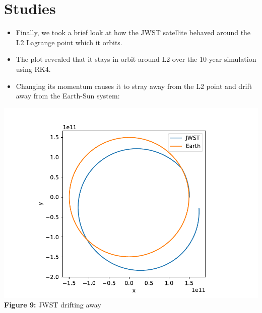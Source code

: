 \documentclass[11pt]{article}
\newcommand{\psubsection}[1]{{\section*{\LARGE #1}}}
\begin{document}
    \psubsection{Studies}
    \begin{itemize}
        \item Finally, we took a brief look at how the JWST satellite behaved around the L2 Lagrange point which it orbits.
        \item The plot revealed that it stays in orbit around L2 over the 10-year simulation using RK4.
        \item Changing its momentum causes it to stray away from the L2 point and drift away from the Earth-Sun system:
    \end{itemize}
    \begin{center}
        \includegraphics[scale = 1]{images/jwst_broken}
        \\ \caption{\textbf{Figure 9:} JWST drifting away}
        \label{fig:fig9}
    \end{center}
\end{document}

